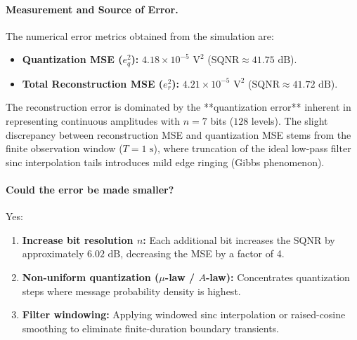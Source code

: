 \documentclass[a4paper]{article}
\begin{document}
    \paragraph{Measurement and Source of Error.}                                                           
    The numerical error metrics obtained from the simulation are:                                          
    \begin{itemize}                                                                                        
      \item \textbf{Quantization MSE ($e_q^2$):} $4.18\times 10^{-5}\text{ V}^2$ ($\text{SQNR} \approx     
      41.75\text{ dB}$).                                                                                   
      \item \textbf{Total Reconstruction MSE ($e_r^2$):} $4.21\times 10^{-5}\text{ V}^2$ ($\text{SQNR}     
      \approx 41.72\text{ dB}$).                                                                           
    \end{itemize}                                                                                          
    The reconstruction error is dominated by the **quantization error** inherent in representing continuous
    amplitudes with $n = 7$ bits ($128$ levels). The slight discrepancy between reconstruction MSE and     
    quantization MSE stems from the finite observation window ($T = 1\text{ s}$), where truncation of the  
    ideal low-pass filter sinc interpolation tails introduces mild edge ringing (Gibbs phenomenon).        
                                                                                                           
    \paragraph{Could the error be made smaller?}                                                           
    Yes:                                                                                                   
    \begin{enumerate}                                                                                      
      \item \textbf{Increase bit resolution $n$:} Each additional bit increases the SQNR by approximately  
      $6.02\text{ dB}$, decreasing the MSE by a factor of 4.                                               
      \item \textbf{Non-uniform quantization ($\mu$-law / $A$-law):} Concentrates quantization steps where 
      message probability density is highest.                                                              
      \item \textbf{Filter windowing:} Applying windowed sinc interpolation or raised-cosine smoothing to  
      eliminate finite-duration boundary transients.                                                       
    \end{enumerate}                                                                                        
                                                                                                           
\end{document}
